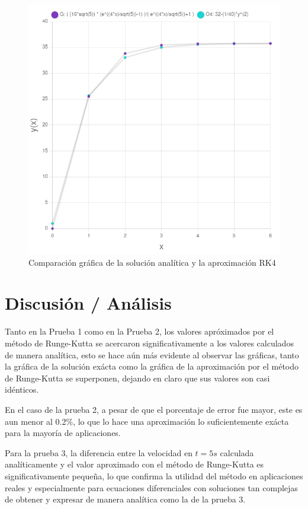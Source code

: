 \documentclass[article, 11pt]{IEEEtran}   %
\begin{document}
\begin{figure}[H]									%
\centering
\includegraphics[scale=0.35]{graficaPrueba3}%
\caption{Comparación gráfica de la solución analítica y la aproximación RK4}\label{diagram4}  %
\end{figure}

\section{Discusi\'on / An\'alisis}
Tanto en la Prueba 1 como en la Prueba 2, los valores apróximados por el método de Runge-Kutta se acercaron significativamente a los valores calculados de manera analítica, esto se hace aún más evidente al observar las gráficas, tanto la gráfica de la solución exácta como la gráfica de la aproximación por el método de Runge-Kutta se superponen, dejando en claro que sus valores son casi idénticos.
\vspace{1em}

En el caso de la prueba 2, a pesar de que el porcentaje de error fue mayor, este es aun menor al 0.2\%, lo que lo hace una aproximación lo suficientemente exácta para la mayoría de aplicaciones.
\vspace{1em}

Para la prueba 3, la diferencia entre la velocidad en $t=5s$ calculada analíticamente y el valor aproximado con el método de Runge-Kutta es significativamente pequeña, lo que confirma la utilidad del método en aplicaciones reales y especialmente para ecuaciones diferenciales con soluciones tan complejas de obtener y expresar de manera analítica como la de la prueba 3.
\end{document}

